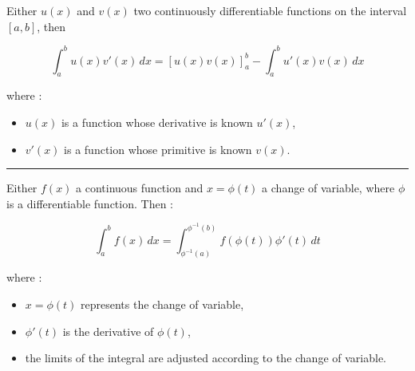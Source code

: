 \begin{f}  

Either \( u(x) \) and \( v(x) \) two continuously differentiable functions on the interval \([a, b]\), then

\[
\int_a^b u(x) v'(x) \, dx = \left[ u(x) v(x) \right]_a^b - \int_a^b u'(x) v(x) \, dx
\]

where :
\begin{itemize}
    \item \( u(x) \) is a function whose derivative is known \( u'(x) \),
    \item \( v'(x) \) is a function whose primitive is known \( v(x) \).
\end{itemize}

\end{f}
\hrule
\begin{f} 

Either \( f(x) \) a continuous function and \( x = \phi(t) \) a change of variable, where \( \phi \) is a differentiable function. Then :

\[
\int_{a}^{b} f(x) \, dx = \int_{\phi^{-1}(a)}^{\phi^{-1}(b)} f(\phi(t)) \phi'(t) \, dt
\]

where :
\begin{itemize}
    \item \( x = \phi(t) \) represents the change of variable,
    \item \( \phi'(t) \) is the derivative of \( \phi(t) \),
    \item the limits of the integral are adjusted according to the change of variable.
\end{itemize}
\end{f}

